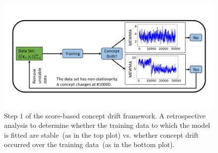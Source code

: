 \documentclass[twoside,11pt]{article}
\begin{document}


\begin{figure}[!htbp]
\centering
\includegraphics[width = .8\linewidth, trim=.35in .68in .35in .69in, clip]{../figures/v14/flow_chart/Retrospective_2.png}
\caption{Step $1$ of the score-based concept drift framework. A retrospective analysis to determine whether the training data to which the model is fitted are stable~(as in the top plot) vs. whether concept drift occurred over the training data~(as in the bottom plot).}
  \label{fig:proc_mon_score_retro}
\end{figure}
\end{document}
